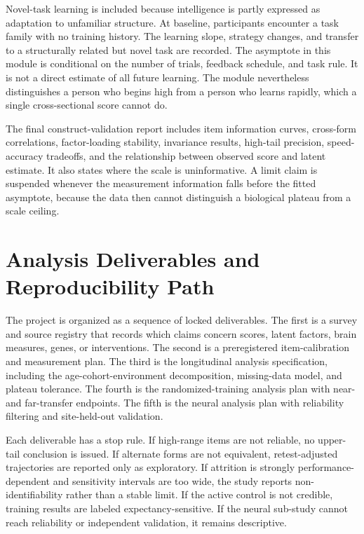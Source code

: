 \documentclass[conference]{IEEEtran}
\begin{document}
Novel-task learning is included because intelligence is partly expressed as adaptation to unfamiliar structure. At baseline, participants encounter a task family with no training history. The learning slope, strategy changes, and transfer to a structurally related but novel task are recorded. The asymptote in this module is conditional on the number of trials, feedback schedule, and task rule. It is not a direct estimate of all future learning. The module nevertheless distinguishes a person who begins high from a person who learns rapidly, which a single cross-sectional score cannot do.

The final construct-validation report includes item information curves, cross-form correlations, factor-loading stability, invariance results, high-tail precision, speed-accuracy tradeoffs, and the relationship between observed score and latent estimate. It also states where the scale is uninformative. A limit claim is suspended whenever the measurement information falls before the fitted asymptote, because the data then cannot distinguish a biological plateau from a scale ceiling.

\section{Analysis Deliverables and Reproducibility Path}
\label{sec:deliverables}
The project is organized as a sequence of locked deliverables. The first is a survey and source registry that records which claims concern scores, latent factors, brain measures, genes, or interventions. The second is a preregistered item-calibration and measurement plan. The third is the longitudinal analysis specification, including the age-cohort-environment decomposition, missing-data model, and plateau tolerance. The fourth is the randomized-training analysis plan with near- and far-transfer endpoints. The fifth is the neural analysis plan with reliability filtering and site-held-out validation.

Each deliverable has a stop rule. If high-range items are not reliable, no upper-tail conclusion is issued. If alternate forms are not equivalent, retest-adjusted trajectories are reported only as exploratory. If attrition is strongly performance-dependent and sensitivity intervals are too wide, the study reports non-identifiability rather than a stable limit. If the active control is not credible, training results are labeled expectancy-sensitive. If the neural sub-study cannot reach reliability or independent validation, it remains descriptive.
\end{document}
